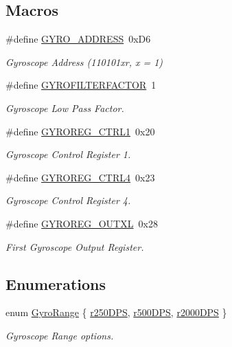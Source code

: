 \subsection*{Macros}
\begin{DoxyCompactItemize}
\item 
\#define \hyperlink{group__gyro_ga8ed1f343e82440b4ef900e5fe42d74f0}{G\-Y\-R\-O\-\_\-\-A\-D\-D\-R\-E\-S\-S}~0x\-D6
\begin{DoxyCompactList}\small\item\em Gyroscope Address (110101xr, x = 1) \end{DoxyCompactList}\item 
\#define \hyperlink{group__gyro_ga1b5d47810976ecbfd688513246db3ba9}{G\-Y\-R\-O\-F\-I\-L\-T\-E\-R\-F\-A\-C\-T\-O\-R}~1
\begin{DoxyCompactList}\small\item\em Gyroscope Low Pass Factor. \end{DoxyCompactList}\item 
\#define \hyperlink{group__gyro_ga59d5eec860eab49733b4a814731e356c}{G\-Y\-R\-O\-R\-E\-G\-\_\-\-C\-T\-R\-L1}~0x20
\begin{DoxyCompactList}\small\item\em Gyroscope Control Register 1. \end{DoxyCompactList}\item 
\#define \hyperlink{group__gyro_gae9b6f4aab3818fdb4c99970918e0a705}{G\-Y\-R\-O\-R\-E\-G\-\_\-\-C\-T\-R\-L4}~0x23
\begin{DoxyCompactList}\small\item\em Gyroscope Control Register 4. \end{DoxyCompactList}\item 
\#define \hyperlink{group__gyro_ga8840a0f1e53e6999ddf435a61c0dc279}{G\-Y\-R\-O\-R\-E\-G\-\_\-\-O\-U\-T\-X\-L}~0x28
\begin{DoxyCompactList}\small\item\em First Gyroscope Output Register. \end{DoxyCompactList}\end{DoxyCompactItemize}
\subsection*{Enumerations}
\begin{DoxyCompactItemize}
\item 
enum \hyperlink{group__gyro_ga12b0e0572fdceaa90874f9364c862ead}{Gyro\-Range} \{ \hyperlink{group__gyro_gga12b0e0572fdceaa90874f9364c862eadad13cb337046598ead5e1fd8de0536efd}{r250\-D\-P\-S}, 
\hyperlink{group__gyro_gga12b0e0572fdceaa90874f9364c862eadad107e50e2c89475d879bbb777f658ab3}{r500\-D\-P\-S}, 
\hyperlink{group__gyro_gga12b0e0572fdceaa90874f9364c862eada738587d78e73a4947f7d00572e6a09b3}{r2000\-D\-P\-S}
 \}
\begin{DoxyCompactList}\small\item\em Gyroscope Range options. \end{DoxyCompactList}\end{DoxyCompactItemize}
